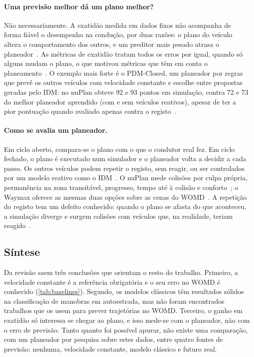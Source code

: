 \paragraph{Uma previsão melhor dá um plano melhor?}
Não necessariamente. A exatidão medida em dados fixos não acompanha de
forma fiável o desempenho na condução, por duas razões: o plano do veículo
altera o comportamento dos outros, e um preditor mais pesado atrasa o
planeador~\cite{tran2023what}. As métricas de exatidão tratam todos os
erros por igual, quando só alguns mudam o plano, o que motivou métricas
que têm em conta o planeamento~\cite{ivanovic2022injecting}. O exemplo
mais forte é o PDM-Closed, um planeador por regras que prevê os outros
veículos com velocidade constante e escolhe entre propostas geradas pelo
IDM: no nuPlan obteve 92 e 93 pontos em simulação, contra 72 e 73 do
melhor planeador aprendido (com e sem veículos reativos), apesar de ter
a pior pontuação quando avaliado apenas contra o
registo~\cite{dauner2023parting}.

\paragraph{Como se avalia um planeador.}
Em ciclo aberto, compara-se o plano com o que o condutor real fez. Em
ciclo fechado, o plano é executado num simulador e o planeador volta a
decidir a cada passo. Os outros veículos podem repetir o registo, sem
reagir, ou ser controlados por um modelo reativo como o
IDM~\cite{karnchanachari2024towards}. O nuPlan mede colisões por culpa
própria, permanência na zona transitável, progresso, tempo até à colisão e
conforto~\cite{karnchanachari2024towards}; o Waymax oferece as mesmas
duas opções sobre as cenas do WOMD~\cite{gulino2023waymax}. A repetição
do registo tem um defeito conhecido: quando o plano se afasta do que
aconteceu, a simulação diverge e surgem colisões com veículos que, na
realidade, teriam reagido~\cite{karnchanachari2024towards,hagedorn2025integration}.

\subsection{Síntese}
\label{sec:sintese}

Da revisão saem três conclusões que orientam o resto do trabalho.
Primeiro, a velocidade constante é a referência obrigatória e o seu erro
no WOMD é conhecido (\cref{tab:baselines}). Segundo, os modelos clássicos
têm resultados sólidos na classificação de manobras em autoestrada, mas
não foram encontrados trabalhos que os usem para prever trajetórias no
WOMD. Terceiro, o ganho em exatidão só interessa se chegar ao plano, e
isso mede-se com o planeador, não com o erro de previsão. Tanto quanto
foi possível apurar, não existe uma comparação, com um planeador por
pesquisa sobre estes dados, entre quatro fontes de previsão: nenhuma,
velocidade constante, modelo clássico e futuro real.
